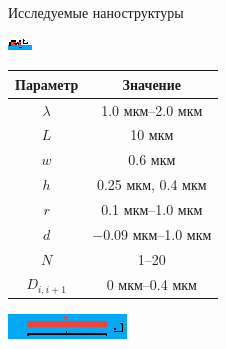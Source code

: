 \begin{frame}{Исследуемые наноструктуры}
	\begin{minipage}[b]{.5\textwidth}
		\includegraphics[width=.95\textwidth]{img/scheme_yz3}
		\vspace{3em}
	\end{minipage}%
	\begin{minipage}[b]{.5\textwidth}
		\begin{table}
			\begin{tabular}{|c|c|}
				\hline
				Параметр & Значение\\
				\hline
				\hline
				$\lambda$ & 1.0 мкм--2.0 мкм \\
				\hline
				$L$ & 10 мкм \\
				\hline
				$w$ & 0.6 мкм \\
				\hline
				$h$ & 0.25 мкм, 0.4 мкм \\
				\hline
				$r$ & 0.1 мкм--1.0 мкм\\
				\hline
				$d$ & $-$0.09 мкм--1.0 мкм\\
				\hline
				$N$ & 1--20 \\
				\hline
				$D_{i, i+1}$ & 0 мкм--0.4 мкм \\
				\hline
			\end{tabular}
		\end{table}
	\end{minipage}
	
	\includegraphics[width=\textwidth]{img/scheme_xy3}
\end{frame}